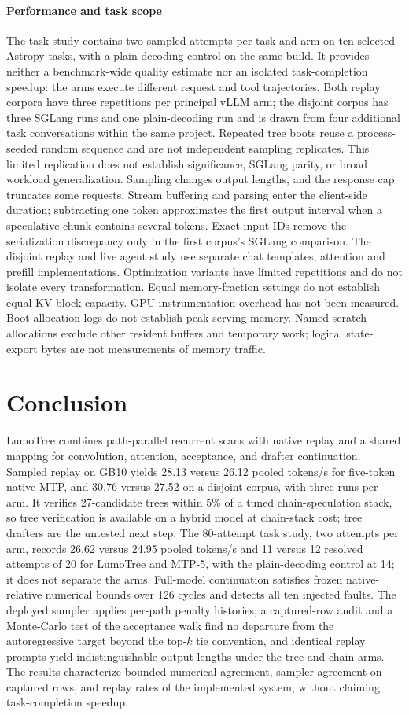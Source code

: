 \documentclass[conference]{IEEEtran}
\newcommand{\sys}{LumoTree}
\begin{document}
\paragraph{Performance and task scope}
The task study contains two sampled attempts per task and arm on ten selected Astropy tasks, with a plain-decoding control on the same build. It provides neither a benchmark-wide quality estimate nor an isolated task-completion speedup: the arms execute different request and tool trajectories. Both replay corpora have three repetitions per principal vLLM arm; the disjoint corpus has three SGLang runs and one plain-decoding run and is drawn from four additional task conversations within the same project. Repeated tree boots reuse a process-seeded random sequence and are not independent sampling replicates. This limited replication does not establish significance, SGLang parity, or broad workload generalization. Sampling changes output lengths, and the response cap truncates some requests. Stream buffering and parsing enter the client-side duration; subtracting one token approximates the first output interval when a speculative chunk contains several tokens. Exact input IDs remove the serialization discrepancy only in the first corpus's SGLang comparison. The disjoint replay and live agent study use separate chat templates, attention and prefill implementations. Optimization variants have limited repetitions and do not isolate every transformation. Equal memory-fraction settings do not establish equal KV-block capacity. GPU instrumentation overhead has not been measured. Boot allocation logs do not establish peak serving memory. Named scratch allocations exclude other resident buffers and temporary work; logical state-export bytes are not measurements of memory traffic.

\section{Conclusion}
\sys{} combines path-parallel recurrent scans with native replay and a shared mapping for convolution, attention, acceptance, and drafter continuation. Sampled replay on GB10 yields 28.13 versus 26.12 pooled tokens/s for five-token native MTP, and 30.76 versus 27.52 on a disjoint corpus, with three runs per arm. It verifies 27-candidate trees within 5\% of a tuned chain-speculation stack, so tree verification is available on a hybrid model at chain-stack cost; tree drafters are the untested next step. The 80-attempt task study, two attempts per arm, records 26.62 versus 24.95 pooled tokens/s and 11 versus 12 resolved attempts of 20 for \sys{} and MTP-5, with the plain-decoding control at 14; it does not separate the arms. Full-model continuation satisfies frozen native-relative numerical bounds over 126 cycles and detects all ten injected faults. The deployed sampler applies per-path penalty histories; a captured-row audit and a Monte-Carlo test of the acceptance walk find no departure from the autoregressive target beyond the top-$k$ tie convention, and identical replay prompts yield indistinguishable output lengths under the tree and chain arms. The results characterize bounded numerical agreement, sampler agreement on captured rows, and replay rates of the implemented system, without claiming task-completion speedup.
\end{document}
